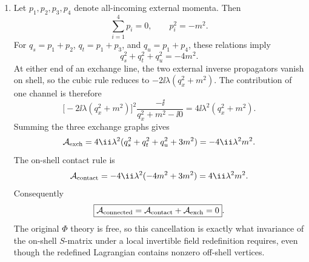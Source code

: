 \begin{enumerate}
\begin{enumerate}
\[\begin{tikzpicture}
 \node[anchor=north east] at (-1.45,-1.08) {\(p_2\)};
 \node[anchor=south west] at (1.45,1.08) {\(p_3\)};
 \node[anchor=north west] at (1.45,-1.08) {\(p_4\)};
 \node at (0,-2.05) {\(u\)};
\end{tikzpicture}.
\]
\item
Let \(p_1,p_2,p_3,p_4\) denote all-incoming external momenta.  Then
\[
 \sum_{i=1}^4p_i=0,
 \qquad p_i^2=-m^2.
\]
For
\(q_s=p_1+p_2\), \(q_t=p_1+p_3\), and
\(q_u=p_1+p_4\), these relations imply
\[
 q_s^2+q_t^2+q_u^2=-4m^2.
\]
At either end of an exchange line, the two external inverse
propagators vanish on shell, so the cubic rule reduces to
\(-2\ii\lambda(q_x^2+m^2)\).  The contribution of one channel is
therefore
\[
 \bigl[-2\ii\lambda(q_x^2+m^2)\bigr]^2
 \frac{-\ii}{q_x^2+m^2-\ii0}
 =4\ii\lambda^2(q_x^2+m^2).
\]
Summing the three exchange graphs gives
\[
 \mathcal A_{\rm exch}
 =4\ii\lambda^2(q_s^2+q_t^2+q_u^2+3m^2)
 =-4\ii\lambda^2m^2.
\]
The on-shell contact rule is
\[
 \mathcal A_{\rm contact}
 =-4\ii\lambda^2(-4m^2+3m^2)
 =4\ii\lambda^2m^2.
\]
Consequently
\[
 \boxed{\mathcal A_{\rm connected}
 =\mathcal A_{\rm contact}+\mathcal A_{\rm exch}=0}.
\]
The original \(\Phi\) theory is free, so this cancellation is exactly
what invariance of the on-shell \(S\)-matrix under a local invertible
field redefinition requires, even though the redefined Lagrangian
contains nonzero off-shell vertices.
\end{enumerate}


\end{enumerate}
